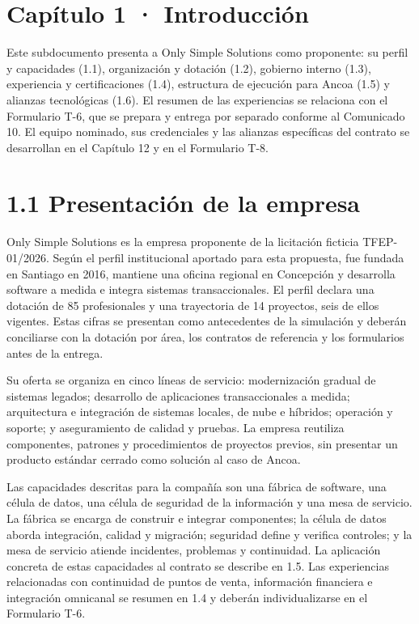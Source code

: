 \documentclass[11pt]{article}
\begin{document}
\tableofcontents
\clearpage

\hypertarget{capuxedtulo-1-introducciuxf3n}{%
\section{Capítulo 1 · Introducción}\label{capuxedtulo-1-introducciuxf3n}}

Este subdocumento presenta a Only Simple Solutions como proponente: su perfil y capacidades (1.1), organización y dotación (1.2), gobierno interno (1.3), experiencia y certificaciones (1.4), estructura de ejecución para Ancoa (1.5) y alianzas tecnológicas (1.6). El resumen de las experiencias se relaciona con el Formulario T-6, que se prepara y entrega por separado conforme al Comunicado 10. El equipo nominado, sus credenciales y las alianzas específicas del contrato se desarrollan en el Capítulo 12 y en el Formulario T-8.

\hypertarget{presentaciuxf3n-de-la-empresa}{%
\section{1.1 Presentación de la empresa}\label{presentaciuxf3n-de-la-empresa}}

Only Simple Solutions es la empresa proponente de la licitación ficticia TFEP-01/2026. Según el perfil institucional aportado para esta propuesta, fue fundada en Santiago en 2016, mantiene una oficina regional en Concepción y desarrolla software a medida e integra sistemas transaccionales. El perfil declara una dotación de 85 profesionales y una trayectoria de 14 proyectos, seis de ellos vigentes. Estas cifras se presentan como antecedentes de la simulación y deberán conciliarse con la dotación por área, los contratos de referencia y los formularios antes de la entrega.

Su oferta se organiza en cinco líneas de servicio: modernización gradual de sistemas legados; desarrollo de aplicaciones transaccionales a medida; arquitectura e integración de sistemas locales, de nube e híbridos; operación y soporte; y aseguramiento de calidad y pruebas. La empresa reutiliza componentes, patrones y procedimientos de proyectos previos, sin presentar un producto estándar cerrado como solución al caso de Ancoa.

Las capacidades descritas para la compañía son una fábrica de software, una célula de datos, una célula de seguridad de la información y una mesa de servicio. La fábrica se encarga de construir e integrar componentes; la célula de datos aborda integración, calidad y migración; seguridad define y verifica controles; y la mesa de servicio atiende incidentes, problemas y continuidad. La aplicación concreta de estas capacidades al contrato se describe en 1.5. Las experiencias relacionadas con continuidad de puntos de venta, información financiera e integración omnicanal se resumen en 1.4 y deberán individualizarse en el Formulario T-6.
\end{document}

